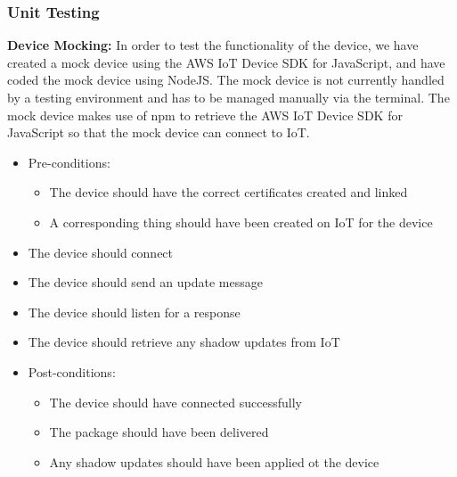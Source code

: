 \documentclass{article}
\begin{document}
			\subsubsection{Unit Testing}
				\textbf{Device Mocking:}
				In order to test the functionality of the device, we have created a mock device using the AWS IoT Device SDK for JavaScript, and have coded the mock device using NodeJS. The mock device is not currently handled by a testing environment and has to be managed manually via the terminal. The mock device makes use of npm to retrieve the AWS IoT Device SDK for JavaScript so that the mock device can connect to IoT.
				\begin{itemize}
					\item Pre-conditions:
						\begin{itemize}
							\item The device should have the correct certificates created and linked
							\item A corresponding thing should have been created on IoT for the device
						\end{itemize}
					\item The device should connect
					\item The device should send an update message
					\item The device should listen for a response
					\item The device should retrieve any shadow updates from IoT
					\item Post-conditions:
						\begin{itemize}
							\item The device should have connected successfully
							\item The package should have been delivered 
							\item Any shadow updates should have been applied ot the device
						\end{itemize}
				\end{itemize}
				
\end{document}
